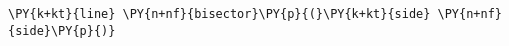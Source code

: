 \begin{Verbatim}[commandchars=\\\{\}]
    \PY{k+kt}{line} \PY{n+nf}{bisector}\PY{p}{(}\PY{k+kt}{side} \PY{n+nf}{side}\PY{p}{)}
\end{Verbatim}
